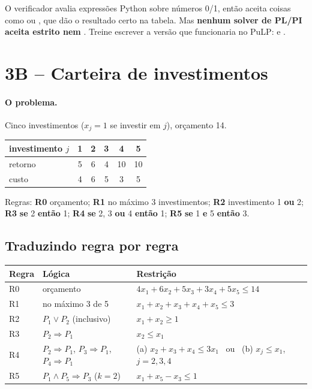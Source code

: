 \begin{atencao}
O verificador avalia expressões Python sobre números 0/1, então aceita coisas como  ou
, que dão o resultado certo na tabela. Mas \textbf{nenhum solver de PL/PI aceita \py{>} estrito nem
\py{!=}}. Treine escrever a versão que funcionaria no PuLP:  e .
\end{atencao}

\section{3B -- Carteira de investimentos}

\paragraph{O problema.} Cinco investimentos ($x_j=1$ se investir em $j$), orçamento 14.
\begin{center}
\begin{tabular}{lccccc}
\toprule
investimento $j$ & 1 & 2 & 3 & 4 & 5\\
\midrule
retorno & 5 & 6 & 4 & 10 & 10\\
custo & 4 & 6 & 5 & 3 & 5\\
\bottomrule
\end{tabular}
\end{center}
Regras: \textbf{R0} orçamento; \textbf{R1} no máximo 3 investimentos; \textbf{R2} investimento 1 \textbf{ou} 2;
\textbf{R3} \textbf{se} 2 \textbf{então} 1; \textbf{R4} \textbf{se} 2, 3 \textbf{ou} 4 \textbf{então} 1; \textbf{R5}
\textbf{se} 1 \textbf{e} 5 \textbf{então} 3.

\subsection*{Traduzindo regra por regra}

\begin{center}
\begin{tabularx}{\linewidth}{lXl}
\toprule
Regra & Lógica & Restrição\\
\midrule
R0 & orçamento & $4x_1+6x_2+5x_3+3x_4+5x_5\le14$\\
R1 & no máximo 3 de 5 & $x_1+x_2+x_3+x_4+x_5\le3$\\
R2 & $P_1\vee P_2$ (inclusivo) & $x_1+x_2\ge1$\\
R3 & $P_2\Rightarrow P_1$ & $x_2\le x_1$\\
R4 & $P_2\Rightarrow P_1$, $P_3\Rightarrow P_1$, $P_4\Rightarrow P_1$ & (a) $x_2+x_3+x_4\le3x_1$ \ ou \ (b) $x_j\le x_1$, $j=2,3,4$\\
R5 & $P_1\wedge P_5\Rightarrow P_3$ ($k=2$) & $x_1+x_5-x_3\le1$\\
\bottomrule
\end{tabularx}
\end{center}


